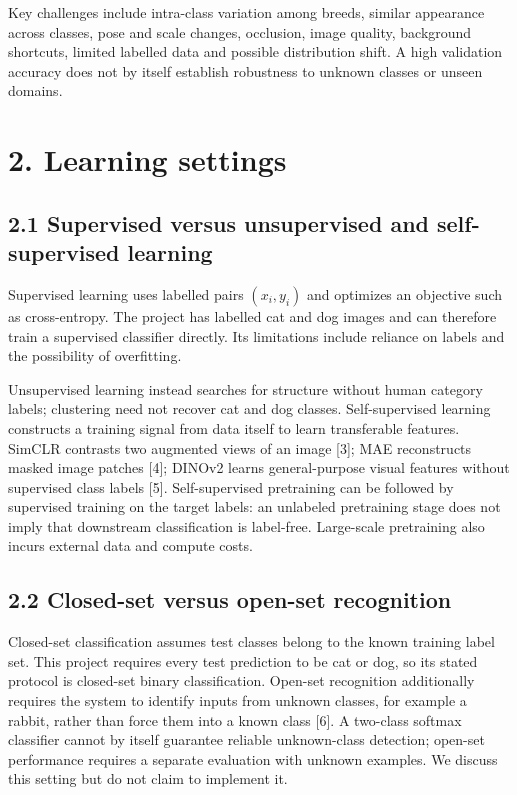 \documentclass[
  10pt,
  a4paper,
]{article}
\begin{document}
Key challenges include intra-class variation among breeds, similar
appearance across classes, pose and scale changes, occlusion, image
quality, background shortcuts, limited labelled data and possible
distribution shift. A high validation accuracy does not by itself
establish robustness to unknown classes or unseen domains.

\section{2. Learning settings}\label{learning-settings}

\subsection{2.1 Supervised versus unsupervised and self-supervised
learning}\label{supervised-versus-unsupervised-and-self-supervised-learning}

Supervised learning uses labelled pairs \((x_i,y_i)\) and optimizes an
objective such as cross-entropy. The project has labelled cat and dog
images and can therefore train a supervised classifier directly. Its
limitations include reliance on labels and the possibility of
overfitting.

Unsupervised learning instead searches for structure without human
category labels; clustering need not recover cat and dog classes.
Self-supervised learning constructs a training signal from data itself
to learn transferable features. SimCLR contrasts two augmented views of
an image {[}3{]}; MAE reconstructs masked image patches {[}4{]}; DINOv2
learns general-purpose visual features without supervised class labels
{[}5{]}. Self-supervised pretraining can be followed by supervised
training on the target labels: an unlabeled pretraining stage does not
imply that downstream classification is label-free. Large-scale
pretraining also incurs external data and compute costs.

\subsection{2.2 Closed-set versus open-set
recognition}\label{closed-set-versus-open-set-recognition}

Closed-set classification assumes test classes belong to the known
training label set. This project requires every test prediction to be
cat or dog, so its stated protocol is closed-set binary classification.
Open-set recognition additionally requires the system to identify inputs
from unknown classes, for example a rabbit, rather than force them into
a known class {[}6{]}. A two-class softmax classifier cannot by itself
guarantee reliable unknown-class detection; open-set performance
requires a separate evaluation with unknown examples. We discuss this
setting but do not claim to implement it.
\end{document}
